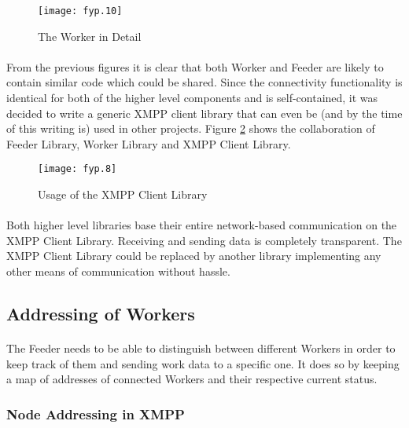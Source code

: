 \begin{figure}[H]
\begin{center}
\texttt{[image: fyp.10]}
\end{center}
\caption{The Worker in Detail}
\label{fig:worker}
\end{figure}

\paragraph{}
From the previous figures it is clear that both Worker and Feeder are likely to contain similar code which could be shared. Since the connectivity functionality is identical for both of the higher level components and is self-contained, it was decided to write a generic XMPP client library that can even be (and by the time of this writing is) used in other projects. Figure \ref{fig:justification} shows the collaboration of Feeder Library, Worker Library and XMPP Client Library.

\begin{figure}[H]
\begin{center}
\texttt{[image: fyp.8]}
\end{center}
\caption{Usage of the XMPP Client Library}
\label{fig:justification}
\end{figure}

\paragraph{}
Both higher level libraries base their entire network-based communication on the XMPP Client Library. Receiving and sending data is completely transparent. The XMPP Client Library could be replaced by another library implementing any other means of communication without hassle.

\subsection{Addressing of Workers}
\paragraph{}
The Feeder needs to be able to distinguish between different Workers in order to keep track of them and sending work data to a specific one. It does so by keeping a map of addresses of connected Workers and their respective current status.

\subsubsection{Node Addressing in XMPP}
